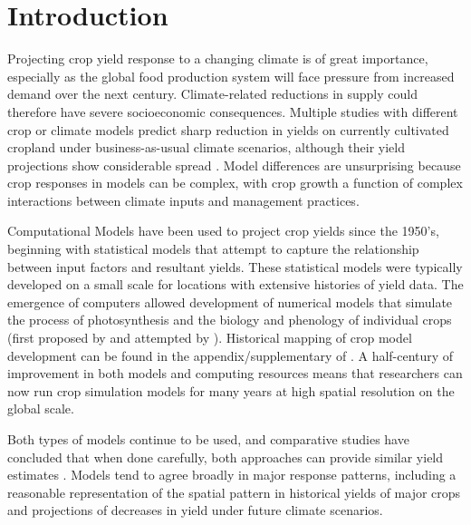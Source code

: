 \documentclass[preprint, 5p, times, twocolumn]{elsarticle}
\begin{document}
\modulolinenumbers[1]
\linenumbers
\section{Introduction}
\label{S:1}
Projecting crop yield response to a changing climate is of great importance, especially as the global food production system will face pressure from increased demand over the next century. Climate-related reductions in supply could therefore have severe socioeconomic consequences. Multiple studies with different crop or climate models predict sharp reduction in yields on currently cultivated cropland under {business-as-usual} climate scenarios, although their yield projections show considerable spread \citep[e.g.\ ][and references therein]{porter2014, Rosenzweig2014, Schauberger2017}. Model differences are unsurprising because crop responses in models can be complex, with crop growth a function of complex interactions between climate inputs and management practices. 

Computational Models have been used to project crop yields since the 1950's, beginning with statistical models \citep{Heady57, Heady61} that attempt to capture the relationship between input factors and resultant yields. These statistical models were typically developed on a small scale for locations with extensive histories of yield data. The emergence of computers allowed development of numerical models that simulate the process of photosynthesis and the biology and phenology of individual crops (first proposed by \citet{wit58, Duncan67} and attempted by \citet{Duncan72}). Historical mapping of crop model development can be found in the appendix/supplementary of \citet{Rosenzweig2014}. A half-century of improvement in both models and computing resources means that researchers can now run crop simulation models for many years at high spatial resolution on the global scale. 

Both types of models continue to be used, and comparative studies have concluded that when done carefully, both approaches can provide similar yield estimates \citep[e.g.\ ][]{Lobell2010, Moore2017, Roberts2017, zhao2017}. Models tend to agree broadly in major response patterns, including a reasonable representation of the spatial pattern in historical yields of major crops \citep[e.g.\ ][]{Elliott2015, muller_global_2017} and projections of decreases in yield under future climate scenarios.
\end{document}
